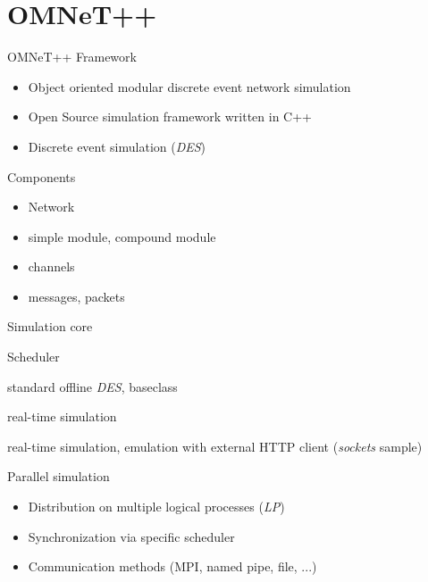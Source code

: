 \section{OMNeT++}
    
\begin{frame}{OMNeT++ Framework}
    \begin{itemize}
        \item Object oriented modular discrete event network simulation
        \item Open Source simulation framework written in C++
        \item Discrete event simulation (\emph{DES})
    \end{itemize}
    
    \begin{block}{Components}
        \begin{itemize}
            \item Network
            \item simple module, compound module
            \item channels
            \item messages, packets
        \end{itemize}
    \end{block}
\end{frame}

\begin{frame}{Simulation core}
    \begin{block}{Scheduler}
        \begin{description}[cRealtimeScheduler]
            \item[cScheduler] standard offline \emph{DES}, baseclass
            \item[cRealtimeScheduler] real-time simulation
            \item[SocketRTScheduler] real-time simulation, emulation with external HTTP client (\emph{sockets} sample)
        \end{description}
    \end{block}
    
    \begin{block}{Parallel simulation}
        \begin{itemize}
            \item Distribution on multiple logical processes (\emph{LP})
            \item Synchronization via specific scheduler
            \item Communication methods (MPI, named pipe, file, ...)
        \end{itemize}
    \end{block}
\end{frame}